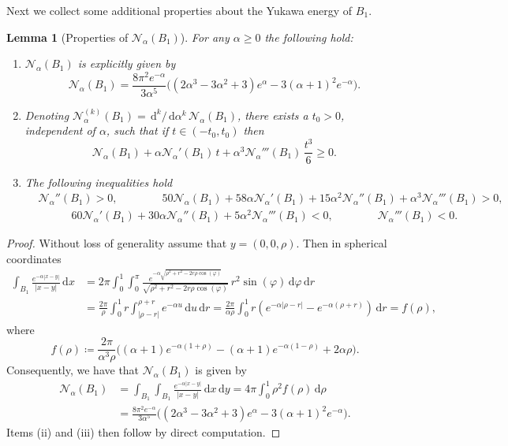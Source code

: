 \documentclass[a4paper,11pt,reqno]{amsart}
\numberwithin{equation}{section}
\newtheorem{lemma}[theorem]{Lemma}
\theoremstyle{remark}
\theoremstyle{definition}
\newcommand{\dd}{\,\mathrm{d}}
\newcommand{\defeq}{\coloneqq}
\newcommand{\nl}{\mathcal{N}_{\alpha}}
\renewcommand{\geq}{\geqslant}
\begin{document}
Next we collect some additional properties about the Yukawa energy of $B_1$.
	\begin{lemma}[Properties of $\nl(B_1)$]\label{lem: Properties of Yukawa B_1} For any $\alpha\geq 0$ the following hold:
		\begin{enumerate}
			\item $\nl(B_1)$ is explicitly given by
			\[
				\nl(B_1) = \frac{8\pi^2e^{-\alpha}}{3\alpha^5}\Big(\left(2\alpha^3-3\alpha^2+3\right) e^{\alpha}-3(\alpha+1)^2e^{-\alpha}\Big).
			\]
			\item Denoting $\nl^{(k)}(B_1)=\dd^k/\dd \alpha^k\, \nl(B_1)$, there exists a $t_0>0$, independent of $\alpha$, such that if $t\in (-t_0,t_0)$ then
			\[
				\nl(B_1)+\alpha\nl'(B_1)\,t+\alpha^3\nl'''(B_1)\,\frac{t^3}{6} \geq 0.
			\]
			\item The following inequalities hold
			\begin{align*}
				&\nl''(B_1)>0, \qquad\qquad 50\nl(B_1)+58\alpha \nl'(B_1)+15\alpha^2\nl''(B_1)+\alpha^3\nl'''(B_1)>0, \\
				&\qquad \quad  60\nl'(B_1)+30\alpha\nl''(B_1)+5\alpha^2\nl'''(B_1) <0, \qquad \qquad \nl'''(B_1)<0.
			\end{align*}
		\end{enumerate}
	\end{lemma}
	
\begin{proof}
Without loss of generality assume that $y=(0,0,\rho)$. Then in spherical coordinates
	\begin{align*}
		\int_{B_1} \frac{e^{-\alpha |x-y|}}{|x-y|} \dd x &= 2\pi \int_0^1 \int_0^{\pi} \frac{e^{-\alpha \sqrt{\rho^2+r^2-2r\rho\cos(\varphi)}}}{\sqrt{\rho^2+r^2-2r\rho\cos(\varphi)}} \, r^2\sin(\varphi) \dd\varphi \dd r \\
											&=\frac{2\pi}{\rho}\int_0^1 r\int_{|\rho-r|}^{\rho+r} e^{-\alpha u} \dd u \dd r=\frac{2\pi}{\alpha \rho}\int_0^1 r(e^{-\alpha|\rho-r|}-e^{-\alpha(\rho+r)}) \dd r =f(\rho),
\end{align*}
where
	\[
		f(\rho) \defeq \frac{2\pi}{\alpha^3 \rho}\Big((\alpha+1)e^{-\alpha(1+\rho)}-(\alpha+1)e^{-\alpha(1-\rho)}+2\alpha\rho \Big).
	\]
Consequently, we have that $\nl(B_1)$ is given by
	\begin{align*}
		\nl(B_1)&=\int_{B_1}\int_{B_1} \frac{e^{-\alpha|x-y|}}{|x-y|} \dd x \dd y = 4\pi\int_0^1 \rho^2f(\rho) \dd\rho \nonumber \\
&=\frac{8\pi^2e^{-\alpha}}{3\alpha^5}\Big(\left(2\alpha^3-3\alpha^2+3\right) e^{\alpha}-3(\alpha+1)^2e^{-\alpha}\Big).
	\end{align*}
Items (ii) and (iii) then follow by direct computation.
\end{proof}
\end{document}
